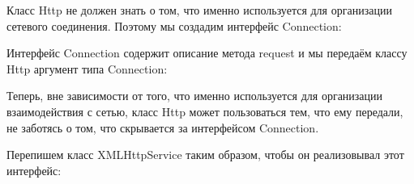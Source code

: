 \documentclass[a4paper]{article}
\begin{document}
Класс Http не должен знать о том, что именно используется для организации сетевого соединения. Поэтому мы создадим интерфейс Connection:

\begin{figure}[h]
\end{figure}

Интерфейс Connection содержит описание метода request и мы передаём классу Http аргумент типа Connection:

\begin{figure}[h]
\end{figure}

Теперь, вне зависимости от того, что именно используется для организации взаимодействия с сетью, класс Http может пользоваться тем, что ему передали, не заботясь о том, что скрывается за интерфейсом Connection.

Перепишем класс XMLHttpService таким образом, чтобы он реализовывал этот интерфейс:

\begin{figure}[h]
\end{figure}
\end{document}
